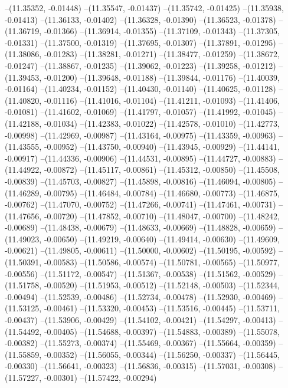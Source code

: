 --(11.35352, -0.01448)
--(11.35547, -0.01437)
--(11.35742, -0.01425)
--(11.35938, -0.01413)
--(11.36133, -0.01402)
--(11.36328, -0.01390)
--(11.36523, -0.01378)
--(11.36719, -0.01366)
--(11.36914, -0.01355)
--(11.37109, -0.01343)
--(11.37305, -0.01331)
--(11.37500, -0.01319)
--(11.37695, -0.01307)
--(11.37891, -0.01295)
--(11.38086, -0.01283)
--(11.38281, -0.01271)
--(11.38477, -0.01259)
--(11.38672, -0.01247)
--(11.38867, -0.01235)
--(11.39062, -0.01223)
--(11.39258, -0.01212)
--(11.39453, -0.01200)
--(11.39648, -0.01188)
--(11.39844, -0.01176)
--(11.40039, -0.01164)
--(11.40234, -0.01152)
--(11.40430, -0.01140)
--(11.40625, -0.01128)
--(11.40820, -0.01116)
--(11.41016, -0.01104)
--(11.41211, -0.01093)
--(11.41406, -0.01081)
--(11.41602, -0.01069)
--(11.41797, -0.01057)
--(11.41992, -0.01045)
--(11.42188, -0.01034)
--(11.42383, -0.01022)
--(11.42578, -0.01010)
--(11.42773, -0.00998)
--(11.42969, -0.00987)
--(11.43164, -0.00975)
--(11.43359, -0.00963)
--(11.43555, -0.00952)
--(11.43750, -0.00940)
--(11.43945, -0.00929)
--(11.44141, -0.00917)
--(11.44336, -0.00906)
--(11.44531, -0.00895)
--(11.44727, -0.00883)
--(11.44922, -0.00872)
--(11.45117, -0.00861)
--(11.45312, -0.00850)
--(11.45508, -0.00839)
--(11.45703, -0.00827)
--(11.45898, -0.00816)
--(11.46094, -0.00805)
--(11.46289, -0.00795)
--(11.46484, -0.00784)
--(11.46680, -0.00773)
--(11.46875, -0.00762)
--(11.47070, -0.00752)
--(11.47266, -0.00741)
--(11.47461, -0.00731)
--(11.47656, -0.00720)
--(11.47852, -0.00710)
--(11.48047, -0.00700)
--(11.48242, -0.00689)
--(11.48438, -0.00679)
--(11.48633, -0.00669)
--(11.48828, -0.00659)
--(11.49023, -0.00650)
--(11.49219, -0.00640)
--(11.49414, -0.00630)
--(11.49609, -0.00621)
--(11.49805, -0.00611)
--(11.50000, -0.00602)
--(11.50195, -0.00592)
--(11.50391, -0.00583)
--(11.50586, -0.00574)
--(11.50781, -0.00565)
--(11.50977, -0.00556)
--(11.51172, -0.00547)
--(11.51367, -0.00538)
--(11.51562, -0.00529)
--(11.51758, -0.00520)
--(11.51953, -0.00512)
--(11.52148, -0.00503)
--(11.52344, -0.00494)
--(11.52539, -0.00486)
--(11.52734, -0.00478)
--(11.52930, -0.00469)
--(11.53125, -0.00461)
--(11.53320, -0.00453)
--(11.53516, -0.00445)
--(11.53711, -0.00437)
--(11.53906, -0.00429)
--(11.54102, -0.00421)
--(11.54297, -0.00413)
--(11.54492, -0.00405)
--(11.54688, -0.00397)
--(11.54883, -0.00389)
--(11.55078, -0.00382)
--(11.55273, -0.00374)
--(11.55469, -0.00367)
--(11.55664, -0.00359)
--(11.55859, -0.00352)
--(11.56055, -0.00344)
--(11.56250, -0.00337)
--(11.56445, -0.00330)
--(11.56641, -0.00323)
--(11.56836, -0.00315)
--(11.57031, -0.00308)
--(11.57227, -0.00301)
--(11.57422, -0.00294)

